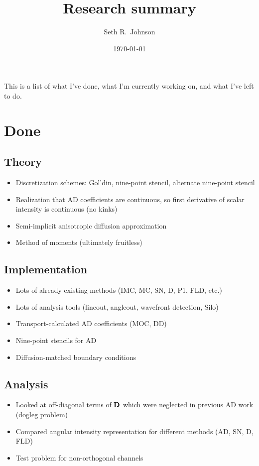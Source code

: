 \documentclass[11pt]{SRJresearch}
\author{Seth R.~Johnson}
\date{\today}
\title{Research summary}
\newcommand{\Dtens}{\mat{D}}
\begin{document}
This is a list of what I've done, what I'm currently working on, and what I've
left to do.

\section{Done}
\subsection{Theory}
\begin{itemize}
  \item Discretization schemes: Gol'din, nine-point stencil, alternate
    nine-point stencil
  \item Realization that AD coefficients are continuous, so first derivative of
    scalar intensity is continuous (no kinks)
  \item Semi-implicit anisotropic diffusion approximation
  \item Method of moments (ultimately fruitless)
\end{itemize}

\subsection{Implementation}
\begin{itemize}
  \item Lots of already existing methods (IMC, MC, SN, D, P1, FLD, etc.)
  \item Lots of analysis tools (lineout, angleout, wavefront detection, Silo)
  \item Transport-calculated AD coefficients (MOC, DD)
  \item Nine-point stencils for AD
  \item Diffusion-matched boundary conditions
\end{itemize}

\subsection{Analysis}
\begin{itemize}
  \item Looked at off-diagonal terms of $\Dtens$ which were neglected in
    previous AD work (dogleg problem)
  \item Compared angular intensity representation for different methods (AD,
    SN, D, FLD)
  \item Test problem for non-orthogonal channels
\end{itemize}
\end{document}
